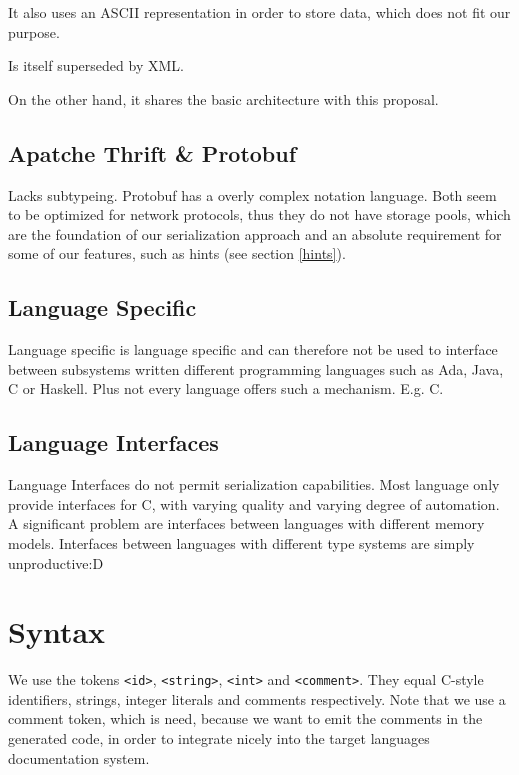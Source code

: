 \documentclass[a4paper,10pt]{article}
\begin{document}
It also uses an ASCII representation in order to store data, which does not fit our purpose.

Is itself superseded by XML.

On the other hand, it shares the basic architecture with this proposal.


\subsection*{Apatche Thrift \& Protobuf}

Lacks subtypeing. Protobuf has a overly complex notation language. Both seem to be optimized for network protocols, thus they do not have storage pools, which are the foundation of our serialization approach and an absolute requirement for some of our features, such as hints (see section \ref{hints}).


\subsection*{Language Specific}

Language specific is language specific and can therefore not be used to interface between subsystems written different programming languages such as Ada, Java, C or Haskell. Plus not every language offers such a mechanism. E.g. C.


\subsection*{Language Interfaces}
Language Interfaces do not permit serialization capabilities. Most language only provide interfaces for C, with varying quality and varying degree of automation. A significant problem are interfaces between languages with different memory models.
Interfaces between languages with different type systems are simply unproductive:D


\section{Syntax}

We use the tokens \verb/<id>/, \verb/<string>/, \verb/<int>/ and \verb/<comment>/. They equal C-style identifiers, strings, integer literals and comments respectively. Note that we use a comment token, which is need, because we want to emit the comments in the generated code, in order to integrate nicely into the target languages documentation system.
\end{document}
